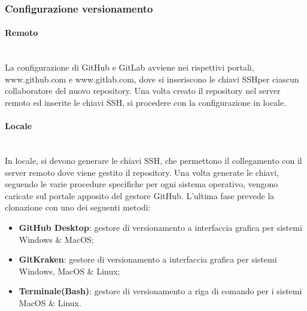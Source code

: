 \subsubsection{Configurazione versionamento}

\paragraph{Remoto} \-\\
	La configurazione di GitHub e GitLab avviene nei rispettivi portali, www.github.com e www.gitlab.com, dove si inseriscono le chiavi SSH\glossario per ciascun collaboratore del nuovo repository. 
	Una volta creato il repository nel server remoto ed inserite le chiavi SSH, si procedere con la configurazione in locale.
	
\paragraph{Locale} \-\\
	In locale, si devono generare le chiavi SSH, che permettono il collegamento con il server remoto dove viene gestito il repository. 
	Una volta generate le chiavi, seguendo le varie procedure specifiche per ogni sistema operativo, vengono caricate sul portale apposito del gestore GitHub.
	L'ultima fase prevede la clonazione con uno dei seguenti metodi: 

	\begin{itemize}
		\item \textbf{GitHub Desktop}: gestore di versionamento a interfaccia grafica per sistemi Windows \& MacOS; 
		\item \textbf{GitKraken}: gestore di versionamento a interfaccia grafica per sistemi Windows, MacOS \& Linux; 		
		\item \textbf{Terminale(Bash)}: gestore di versionamento a riga di comando per i sistemi MacOS \& Linux.
	\end{itemize}
		